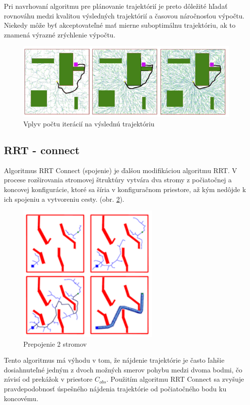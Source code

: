 Pri navrhovaní algoritmu pre plánovanie trajektórií je preto dôležité hľadať rovnováhu medzi kvalitou výsledných trajektórií a časovou náročnosťou výpočtu. Niekedy môže byť akceptovateľné mať mierne suboptimálnu trajektóriu, ak to znamená výrazné zrýchlenie výpočtu. 

\begin{figure}[h]
	\centering
	\includegraphics[width=160mm]{img/RRT2.png}
	\caption{Vplyv počtu iterácií na výslednú trajektóriu \cite{RRT-Kuffner}}\label{OBRAZOK 1.2.2} 
\end{figure} 

\subsection{RRT - connect}
\label{kap:2.3}
Algoritmus RRT Connect (spojenie) je ďalšou modifikáciou algoritmu RRT. V procese rozširovania stromovej štruktúry vytvára dva stromy z počiatočnej a koncovej konfigurácie, ktoré sa šíria v konfiguračnom priestore, až kým nedôjde k ich spojeniu a vytvoreniu cesty. (obr. \ref{OBRAZOK 1.2.3}). 

\begin{figure}[h!]
	\centering
	\includegraphics[width=70mm]{img/RRT-connect.png}
	\caption{Prepojenie 2 stromov \cite{RRT-Kuffner}}\label{OBRAZOK 1.2.3} 
\end{figure} 

Tento algoritmus má výhodu v tom, že nájdenie trajektórie je často ľahšie dosiahnuteľné jedným z dvoch možných smerov pohybu medzi dvoma bodmi, čo závisí od prekážok v priestore $C_{obs}$. Použitím algoritmu RRT Connect sa zvyšuje pravdepodobnosť úspešného nájdenia trajektórie od počiatočného bodu ku koncovému.

